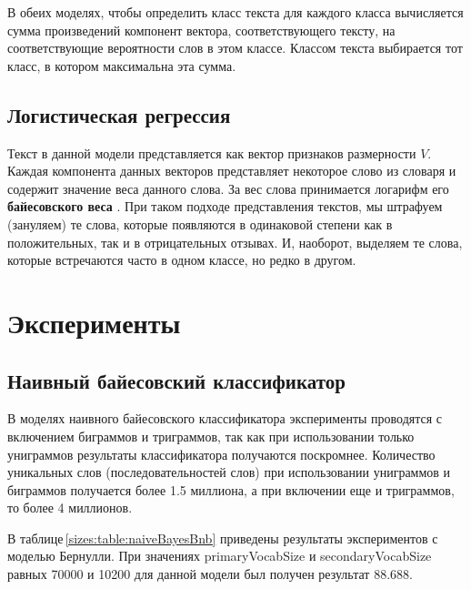 В обеих моделях, чтобы определить класс текста для каждого класса вычисляется сумма произведений компонент вектора, соответствующего тексту, на соответствующие вероятности слов в этом классе. Классом текста выбирается тот класс, в котором максимальна эта сумма.

\subsection{Логистическая регрессия}
Текст в данной модели представляется как вектор признаков размерности $V$. Каждая компонента данных векторов представляет некоторое слово из словаря и содержит значение веса данного слова. За вес слова принимается логарифм его {\bf байесовского веса} \cite{nbsvm}. При таком подходе представления текстов, мы штрафуем (зануляем) те слова, которые появляются в одинаковой степени как в положительных, так и в отрицательных отзывах. И, наоборот, выделяем те слова, которые встречаются часто в одном классе, но редко в другом.

\section{Эксперименты}
\subsection{Наивный байесовский классификатор}
В моделях наивного байесовского классификатора эксперименты проводятся с включением биграммов и триграммов, так как при использовании только униграммов результаты классификатора получаются поскромнее. Количество уникальных слов (последовательностей слов) при использовании униграммов и биграммов получается более 1.5 миллиона, а при включении еще и триграммов, то более 4 миллионов.

В таблице\,\ref{sizes:table:naiveBayesBnb} приведены результаты экспериментов с моделью Бернулли. При значениях primaryVocabSize и secondaryVocabSize равных 70000 и 10200 для данной модели был получен результат 88.688.

